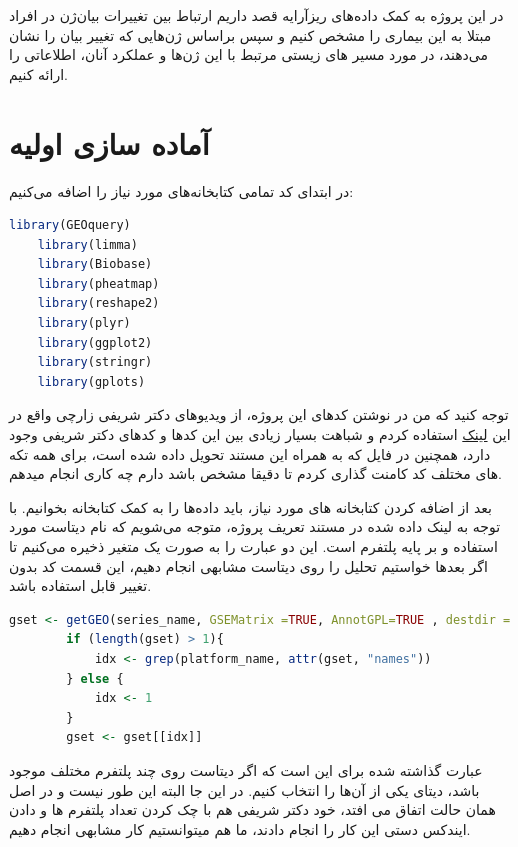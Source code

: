 \documentclass[12pt]{article}
\begin{document}
 در این پروژه به کمک داده‌های ریزآرایه قصد داریم ارتباط بین تغییرات بیان‌ژن در افراد مبتلا به این بیماری را مشخص کنیم و سپس براساس ژن‌هایی که تغییر بیان را نشان می‌دهند، در مورد مسیر های زیستی
مرتبط با این ژن‌ها
 و عملکرد آنان، اطلاعاتی را ارائه کنیم.
 
\section{آماده سازی اولیه}

در ابتدای کد تمامی کتابخانه‌های مورد نیاز را اضافه می‌کنیم:

\begin{latin}
\begin{lstlisting}[language=R]
	library(GEOquery)
	library(limma)
	library(Biobase)
	library(pheatmap)
	library(reshape2)
	library(plyr)
	library(ggplot2)
	library(stringr)
	library(gplots)
\end{lstlisting}
\end{latin}
توجه کنید که من در نوشتن کدهای این پروژه، از ویدیوهای دکتر شریفی زارچی واقع در این 
\href{https://maktabkhooneh.org/course/%D8%A8%DB%8C%D9%88%D8%A7%D9%86%D9%81%D9%88%D8%B1%D9%85%D8%A7%D8%AA%DB%8C%DA%A9-%D9%BE%DB%8C%D8%B4%D8%B1%D9%81%D8%AA%D9%87-mk375/}{لینک} 
استفاده کردم و شباهت بسیار زیادی بین این کدها و کدهای دکتر شریفی وجود دارد، همچنین در فایل  که به همراه این مستند تحویل داده شده است، برای همه تکه های مختلف کد کامنت گذاری کردم تا دقیقا مشخص باشد دارم چه کاری انجام میدهم.

بعد از اضافه کردن کتابخانه های مورد نیاز، باید داده‌ها را به کمک کتابخانه  بخوانیم. با توجه به لینک داده شده در مستند تعریف پروژه،  متوجه می‌شویم که نام دیتاست مورد استفاده  و بر پایه پلتفرم  است. این دو عبارت را به صورت یک متغیر ذخیره می‌کنیم تا اگر بعدها خواستیم تحلیل را روی دیتاست مشابهی انجام دهیم، این قسمت کد بدون تغییر قابل استفاده باشد.

\begin{latin}
	\begin{lstlisting}[language=R]
		gset <- getGEO(series_name, GSEMatrix =TRUE, AnnotGPL=TRUE , destdir = "Data")
		if (length(gset) > 1){
			idx <- grep(platform_name, attr(gset, "names"))
		} else {
			idx <- 1
		}
		gset <- gset[[idx]]
	\end{lstlisting}
\end{latin}


عبارت  گذاشته شده برای این است که اگر دیتاست روی چند پلتفرم مختلف موجود باشد، دیتای یکی از آن‌ها را انتخاب کنیم. در این جا البته این طور نیست و در اصل همان حالت  اتفاق می افتد،
خود دکتر شریفی هم با چک کردن تعداد پلتفرم ها و دادن ایندکس دستی این کار را انجام دادند، ما هم میتوانستیم کار مشابهی انجام دهیم.
\end{document}
